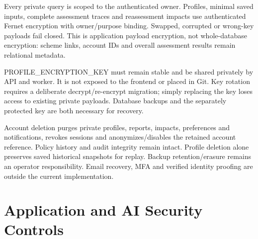 \documentclass[12pt,a4paper,twoside]{report}
\begin{document}
Every private query is scoped to the authenticated owner. Profiles, minimal saved inputs, complete assessment traces and reassessment impacts use authenticated Fernet encryption with owner/purpose binding. Swapped, corrupted or wrong-key payloads fail closed. This is application payload encryption, not whole-database encryption: scheme links, account IDs and overall assessment results remain relational metadata.

PROFILE\_ENCRYPTION\_KEY must remain stable and be shared privately by API and worker. It is not exposed to the frontend or placed in Git. Key rotation requires a deliberate decrypt/re-encrypt migration; simply replacing the key loses access to existing private payloads. Database backups and the separately protected key are both necessary for recovery.

Account deletion purges private profiles, reports, impacts, preferences and notifications, revokes sessions and anonymizes/disables the retained account reference. Policy history and audit integrity remain intact. Profile deletion alone preserves saved historical snapshots for replay. Backup retention/erasure remains an operator responsibility. Email recovery, MFA and verified identity proofing are outside the current implementation.

\section{Application and AI Security Controls}
\end{document}
